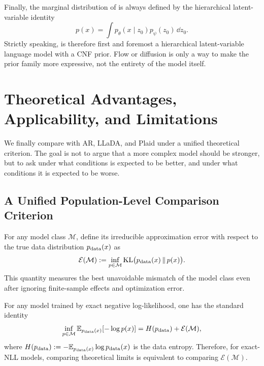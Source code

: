 Finally, the marginal distribution of \method is always defined by the hierarchical latent-variable identity
\begin{equation}
p(x)=\int p_{\theta}(x\mid z_0)p_{\psi}(z_0)\,\dd z_0.
\label{eq:app_ldlm_hierarchical_identity}
\end{equation}
Strictly speaking, \method is therefore first and foremost a hierarchical latent-variable language model with a CNF prior. Flow or diffusion is only a way to make the prior family more expressive, not the entirety of the model itself.

\section{Theoretical Advantages, Applicability, and Limitations}
\label{app:advantages}

We finally compare \method with AR, LLaDA, and Plaid under a unified theoretical criterion. The goal is not to argue that a more complex model should be stronger, but to ask under what conditions \method is expected to be better, and under what conditions it is expected to be worse.

\subsection{A Unified Population-Level Comparison Criterion}
\label{app:population_risk}

For any model class $\mathcal M$, define its irreducible approximation error with respect to the true data distribution $p_{\mathrm{data}}(x)$ as
\begin{equation}
\mathcal E(\mathcal M)
:=
\inf_{p\in\mathcal M}\mathrm{KL}\bigl(p_{\mathrm{data}}(x)\,\|\,p(x)\bigr).
\label{eq:app_model_class_error}
\end{equation}
This quantity measures the best unavoidable mismatch of the model class even after ignoring finite-sample effects and optimization error.

For any model trained by exact negative log-likelihood, one has the standard identity
\begin{equation}
\inf_{p\in\mathcal M}\mathbb{E}_{p_{\mathrm{data}}(x)}[-\log p(x)]
=
H(p_{\mathrm{data}})+\mathcal E(\mathcal M),
\label{eq:app_population_risk_exact_nll}
\end{equation}
where $H(p_{\mathrm{data}}):=-\mathbb{E}_{p_{\mathrm{data}}(x)}\log p_{\mathrm{data}}(x)$ is the data entropy. Therefore, for exact-NLL models, comparing theoretical limits is equivalent to comparing $\mathcal E(\mathcal M)$.

